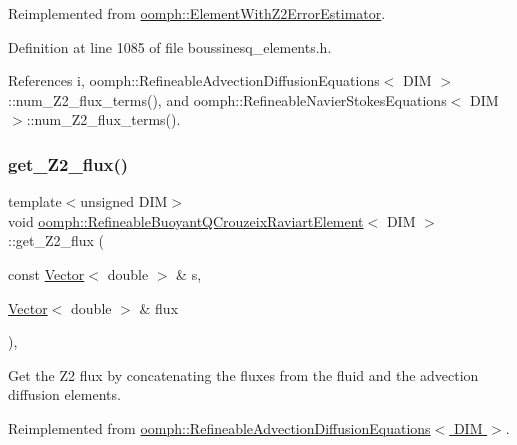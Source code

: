 Reimplemented from \hyperlink{classoomph_1_1ElementWithZ2ErrorEstimator_a2d894f4d55c63e77bd9f3420ccf9d315}{oomph\+::\+Element\+With\+Z2\+Error\+Estimator}.



Definition at line 1085 of file boussinesq\+\_\+elements.\+h.



References i, oomph\+::\+Refineable\+Advection\+Diffusion\+Equations$<$ D\+I\+M $>$\+::num\+\_\+\+Z2\+\_\+flux\+\_\+terms(), and oomph\+::\+Refineable\+Navier\+Stokes\+Equations$<$ D\+I\+M $>$\+::num\+\_\+\+Z2\+\_\+flux\+\_\+terms().

\mbox{\label{classoomph_1_1RefineableBuoyantQCrouzeixRaviartElement_a1b78fb6b311b89cff1b57fcaacd924d7}} 
\subsubsection{\texorpdfstring{get\+\_\+\+Z2\+\_\+flux()}{get\_Z2\_flux()}}
{\footnotesize\ttfamily template$<$unsigned D\+IM$>$ \\
void \hyperlink{classoomph_1_1RefineableBuoyantQCrouzeixRaviartElement}{oomph\+::\+Refineable\+Buoyant\+Q\+Crouzeix\+Raviart\+Element}$<$ D\+IM $>$\+::get\+\_\+\+Z2\+\_\+flux (\begin{DoxyParamCaption}\item[{const \hyperlink{classoomph_1_1Vector}{Vector}$<$ double $>$ \&}]{s,  }\item[{\hyperlink{classoomph_1_1Vector}{Vector}$<$ double $>$ \&}]{flux }\end{DoxyParamCaption})\hspace{0.3cm}{\ttfamily [inline]}, {\ttfamily [virtual]}}



Get the Z2 flux by concatenating the fluxes from the fluid and the advection diffusion elements. 



Reimplemented from \hyperlink{classoomph_1_1RefineableAdvectionDiffusionEquations_ae28af2d25f78d02a4cbe6b382dcc9546}{oomph\+::\+Refineable\+Advection\+Diffusion\+Equations$<$ D\+I\+M $>$}.



